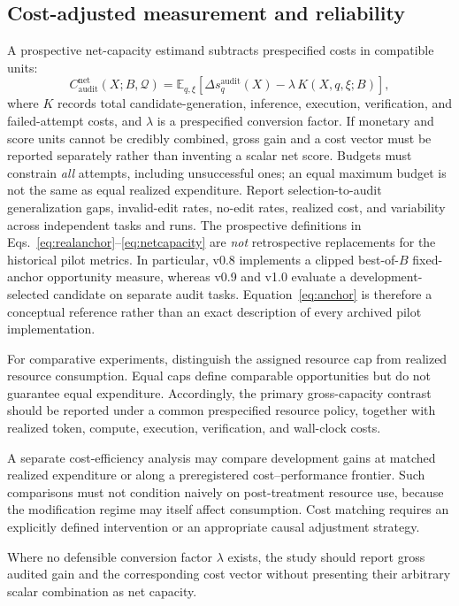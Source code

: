 \documentclass[11pt,a4paper]{article}
\begin{document}
\subsection{Cost-adjusted measurement and reliability}
A prospective net-capacity estimand subtracts prespecified costs in compatible units:
\begin{equation}
C_{\mathrm{audit}}^{\mathrm{net}}(X;B,\mathcal Q)=\mathbb E_{q,\xi}\left[\Delta s_q^{\mathrm{audit}}(X)-\lambda\,K(X,q,\xi;B)\right],\label{eq:netcapacity}
\end{equation}
where \(K\) records total candidate-generation, inference, execution, verification, and failed-attempt costs, and \(\lambda\) is a prespecified conversion factor. If monetary and score units cannot be credibly combined, gross gain and a cost vector must be reported separately rather than inventing a scalar net score. Budgets must constrain \emph{all} attempts, including unsuccessful ones; an equal maximum budget is not the same as equal realized expenditure. Report selection-to-audit generalization gaps, invalid-edit rates, no-edit rates, realized cost, and variability across independent tasks and runs. The prospective definitions in Eqs.~\eqref{eq:realanchor}--\eqref{eq:netcapacity}
are \emph{not} retrospective replacements for the historical pilot metrics. In particular, v0.8
implements a clipped best-of-$B$ fixed-anchor opportunity measure, whereas v0.9 and v1.0 evaluate
a development-selected candidate on separate audit tasks. Equation~\eqref{eq:anchor} is therefore a
conceptual reference rather than an exact description of every archived pilot implementation.

For comparative experiments, distinguish the assigned resource cap from realized resource
consumption. Equal caps define comparable opportunities but do not guarantee equal expenditure. Accordingly, the primary gross-capacity contrast should be reported under a common prespecified resource policy, together with realized token, compute, execution, verification, and wall-clock costs.

A separate cost-efficiency analysis may compare development gains at matched realized expenditure or along a preregistered cost--performance frontier. Such comparisons must not condition naively on post-treatment resource use, because the modification regime may itself affect consumption. Cost matching
requires an explicitly defined intervention or an appropriate causal adjustment strategy.

Where no defensible conversion factor $\lambda$ exists, the study should report gross audited gain and the corresponding cost vector without presenting their arbitrary scalar combination as net capacity.
\end{document}
